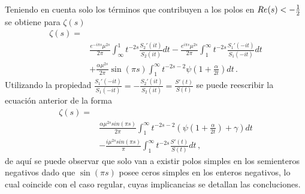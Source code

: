 Teniendo en cuenta solo los términos que contribuyen a los polos en  $R{\rm } e(s) < - \frac{1}{2}$ se obtiene para $\zeta (s)$
\begin{align}
\nonumber
	\zeta  (s) =& 	
\\[10pt]
& 
	\frac{e ^{- i \pi s} \mu ^{2s } }{2 \pi}
	\int _{\infty} ^{1} t ^{-2s } 
		\frac{S _2' (it)}{S _2 (it)}
		d t - 
	\frac{e ^{i \pi s} \mu ^{2s}}{2 \pi}
	\int _{1} ^{\infty} t ^{-2s } 
	\frac{S _1 ' (-it)}{S _1 (-it)}
	d t
\nonumber 
	 \\[10pt]
	&  + \frac{\alpha \mu ^{2s} }{2 \pi }	\sin ( \pi s)  \int _1 ^{\infty}
	t ^{-2s-2}  \psi \left( 1 + \frac{\alpha}{2 t}\right) dt 
		\, .
\end{align}
Utilizando la propiedad  $\frac{S _1 ' (-it)}{S _1 (-i t)} = - \frac{S _2 ' (i t)}{S _2 (it)} = \frac{S'(t)}{S(t)}  $ se puede reescribir la ecuación anterior de la forma
\begin{equation}
\begin{aligned}
\zeta  (s) =&  \\[5pt]
&
\frac{\alpha \mu ^{2s} sin( \pi s )}{2 \pi } \int _{1} ^{\infty} 
t ^{-2s-2} \left( \psi (1 + \frac{\alpha}{2 t}) + \gamma \right) dt 
\\[5pt]
& -  \frac{i \mu ^{2s}  sin (\pi s)}{\pi} \int _1 ^{\infty} t ^{-2s} \frac{S'(t)}{S(t)} dt 
	\, ,
\end{aligned}
\end{equation}
de aquí se puede observar que solo van a existir polos simples en los semienteros negativos dado que $\sin (\pi s)$ posee ceros simples en los enteros negativos, lo cual coincide con el caso regular, cuyas implicancias se detallan las concluciones.



